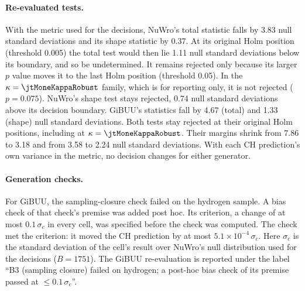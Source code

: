 \paragraph{Re-evaluated tests.} With the metric used for the decisions, NuWro's total statistic falls by 3.83 null standard deviations and its shape statistic by 0.37.  At its original Holm position (threshold 0.005) the total test would then lie 1.11 null standard deviations below its boundary, and so be undetermined.  It remains rejected only because its larger $p$ value moves it to the last Holm position (threshold 0.05). In the $\kappa=\jtMoneKappaRobust$ family, which is for reporting only, it is not rejected ($p=0.075$). NuWro's shape test stays rejected, 0.74 null standard deviations above its decision boundary.  GiBUU's statistics fall by 4.67 (total) and 1.33 (shape) null standard deviations. Both tests stay rejected at their original Holm positions, including at $\kappa=\jtMoneKappaRobust$. Their margins shrink from 7.86 to 3.18 and from 3.58 to 2.24 null standard deviations.  With each CH prediction's own variance in the metric, no decision changes for either generator.

\paragraph{Generation checks.} For GiBUU, the sampling-closure check failed on the hydrogen sample. A bias check of that check's premise was added post hoc. Its criterion, a change of at most $0.1\,\sigma_{c}$ in every cell, was specified before the check was computed. The check met the criterion: it moved the CH prediction by at most $5.1\times10^{-4}\,\sigma_{c}$. Here $\sigma_{c}$ is the standard deviation of the cell's result over NuWro's null distribution used for the decisions ($B=1751$). The GiBUU re-evaluation is reported under the label ``B3 (sampling closure) failed on hydrogen; a post-hoc bias check of its premise passed at $\le0.1\,\sigma_{c}$''.

